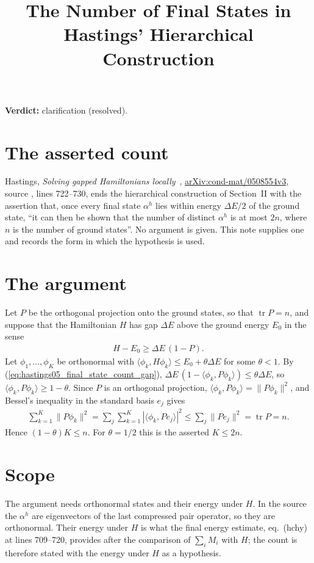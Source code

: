 \documentclass{article}
\title{The Number of Final States in Hastings' Hierarchical Construction}
\author{}
\date{}
\providecommand{\gapnote}[2]{\par\noindent\textbf{Verdict:} #1 (#2).\par}
\begin{document}
\maketitle
\gapnote{clarification}{resolved}

\section{The asserted count}
Hastings, \emph{Solving gapped Hamiltonians locally}~\cite{Hastings2006Solving},
\href{https://arxiv.org/abs/cond-mat/0508554v3}{arXiv:cond-mat/0508554v3},
source , lines 722--730, ends the hierarchical construction
of Section~II with the assertion that, once every final state $\alpha^h$ lies
within energy $\Delta E/2$ of the ground state, ``it can then be shown that
the number of distinct $\alpha^h$ is at most $2n$, where $n$ is the number of
ground states''. No argument is given. This note supplies one and records the
form in which the hypothesis is used.

\section{The argument}
Let $P$ be the orthogonal projection onto the ground states, so that
$\operatorname{tr}P=n$, and suppose that the Hamiltonian $H$ has gap $\Delta E$
above the ground energy $E_0$ in the sense
\begin{align}
 H-E_0\ge\Delta E\,(1-P).
 \label{eq:hastings05_final_state_count_gap}
\end{align}
Let $\phi_1,\dots,\phi_K$ be orthonormal with
$\langle\phi_k,H\phi_k\rangle\le E_0+\theta\Delta E$ for some $\theta<1$. By
(\ref{eq:hastings05_final_state_count_gap}),
$\Delta E\,(1-\langle\phi_k,P\phi_k\rangle)\le\theta\Delta E$, so
$\langle\phi_k,P\phi_k\rangle\ge1-\theta$. Since $P$ is an orthogonal
projection, $\langle\phi_k,P\phi_k\rangle=\|P\phi_k\|^2$, and Bessel's
inequality in the standard basis $e_j$ gives
\begin{align}
 \sum_{k=1}^K\|P\phi_k\|^2
 =\sum_j\sum_{k=1}^K|\langle\phi_k,Pe_j\rangle|^2
 \le\sum_j\|Pe_j\|^2=\operatorname{tr}P=n.
 \label{eq:hastings05_final_state_count_bessel}
\end{align}
Hence $(1-\theta)K\le n$. For $\theta=1/2$ this is the asserted $K\le2n$.

\section{Scope}
The argument needs orthonormal states and their energy under $H$. In the source
the $\alpha^h$ are eigenvectors of the last compressed pair operator, so they
are orthonormal. Their energy under $H$ is what the final energy estimate,
eq.~(hchy) at lines 709--720, provides after the comparison of
$\sum_iM_i$ with $H$; the count is therefore stated with the energy under $H$
as a hypothesis.


\end{document}
